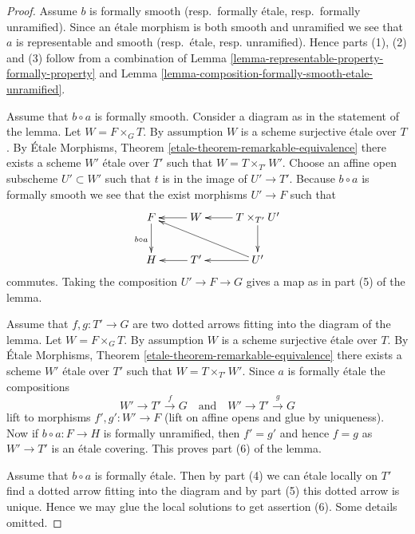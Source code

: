 \documentclass[10pt,a4paper]{amsart}
\theoremstyle{plain}
\theoremstyle{definition}
\theoremstyle{remark}
\numberwithin{equation}{subsection}
\begin{document}
\begin{proof}
Assume $b$ is formally smooth (resp.\ formally \'etale,
resp.\ formally unramified). Since an \'etale morphism is both
smooth and unramified we see that $a$ is representable and smooth
(resp.\ \'etale, resp. unramified). Hence parts (1), (2) and (3)
follow from a combination of
Lemma \ref{lemma-representable-property-formally-property}
and
Lemma \ref{lemma-composition-formally-smooth-etale-unramified}.

\medskip\noindent
Assume that $b \circ a$ is formally smooth. Consider a diagram
as in the statement of the lemma. Let $W = F \times_G T$.
By assumption $W$ is a scheme surjective \'etale over $T$. By
\'Etale Morphisms, Theorem \ref{etale-theorem-remarkable-equivalence}
there exists a scheme $W'$ \'etale over $T'$ such that $W = T \times_{T'} W'$.
Choose an affine open subscheme $U' \subset W'$ such that $t$ is in
the image of $U' \to T'$. Because $b \circ a$ is formally
smooth we see that the exist morphisms $U' \to F$ such that
$$
\xymatrix{
F \ar[d]_{b \circ a} & W \ar[l] & T \times_{T'} U' \ar[d] \ar[l]\\
H & T' \ar[l] & U' \ar[llu] \ar[l]
}
$$
commutes. Taking the composition $U' \to F \to G$ gives a
map as in part (5) of the lemma.

\medskip\noindent
Assume that $f, g : T' \to G$ are two dotted arrows fitting into the
diagram of the lemma. Let $W = F \times_G T$.
By assumption $W$ is a scheme surjective \'etale over $T$. By
\'Etale Morphisms, Theorem \ref{etale-theorem-remarkable-equivalence}
there exists a scheme $W'$ \'etale over $T'$ such that $W = T \times_{T'} W'$.
Since $a$ is formally \'etale the compositions
$$
W' \to T' \xrightarrow{f} G
\quad\text{and}\quad
W' \to T' \xrightarrow{g} G
$$
lift to morphisms $f', g' : W' \to F$ (lift on affine opens and glue by
uniqueness). Now if $b \circ a : F \to H$ is formally unramified, then
$f' = g'$ and hence $f = g$ as $W' \to T'$ is an \'etale covering. This proves
part (6) of the lemma.

\medskip\noindent
Assume that $b \circ a$ is formally \'etale. Then by part (4) we
can \'etale locally on $T'$ find a dotted arrow fitting into the diagram
and by part (5) this dotted arrow is unique. Hence we may glue the
local solutions to get assertion (6). Some details omitted.
\end{proof}
\end{document}
